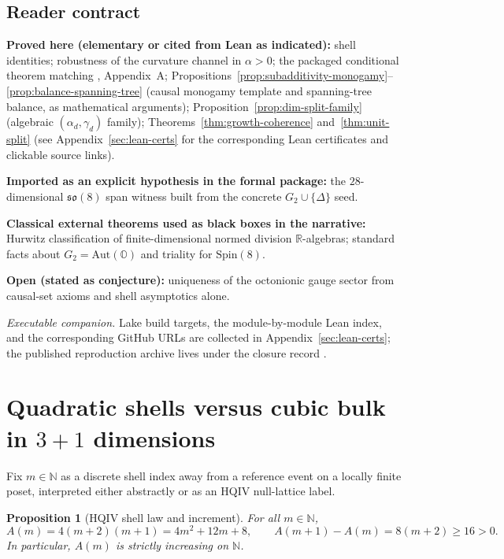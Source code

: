 \documentclass[11pt]{amsart}
\newtheorem{proposition}[theorem]{Proposition}
\begin{document}
\subsection{Reader contract}

\textbf{Proved here (elementary or cited from Lean as indicated):} shell identities; robustness of the curvature channel in \(\alpha>0\); the packaged conditional theorem matching \cite{hqiv-so8-paper}, Appendix~A; Propositions~\ref{prop:subadditivity-monogamy}--\ref{prop:balance-spanning-tree} (causal monogamy template and spanning-tree balance, as mathematical arguments); Proposition~\ref{prop:dim-split-family} (algebraic \((\alpha_d,\gamma_d)\) family); Theorems~\ref{thm:growth-coherence} and~\ref{thm:unit-split} (see Appendix~\ref{sec:lean-certs} for the corresponding Lean certificates and clickable source links).

\textbf{Imported as an explicit hypothesis in the formal package:} the \(28\)-dimensional \(\mathfrak{so}(8)\) span witness built from the concrete \(G_2\cup\{\Delta\}\) seed.

\textbf{Classical external theorems used as black boxes in the narrative:} Hurwitz classification of finite-dimensional normed division \(\mathbb{R}\)-algebras; standard facts about \(G_2=\mathrm{Aut}(\mathbb{O})\) and triality for \(\mathrm{Spin}(8)\).

\textbf{Open (stated as conjecture):} uniqueness of the octonionic gauge sector from causal-set axioms and shell asymptotics alone.

\medskip
\noindent\textit{Executable companion.} Lake build targets, the module-by-module Lean index, and the corresponding GitHub URLs are collected in Appendix~\ref{sec:lean-certs}; the published reproduction archive lives under the closure record \cite{hqiv-so8-paper}.

\section{Quadratic shells versus cubic bulk in \texorpdfstring{$3{+}1$}{3+1} dimensions}
\label{sec:quadratic-vs-cubic}

Fix \(m\in\mathbb{N}\) as a discrete shell index away from a reference event on a locally finite poset, interpreted either abstractly or as an HQIV null-lattice label.

\begin{proposition}[HQIV shell law and increment]
\label{prop:shell-law}
For all \(m\in\mathbb{N}\),
\[
A(m)=4(m+2)(m+1)=4m^2+12m+8,\qquad
A(m+1)-A(m)=8(m+2)\ge 16>0.
\]
In particular, \(A(m)\) is strictly increasing on \(\mathbb{N}\).
\end{proposition}
\end{document}
